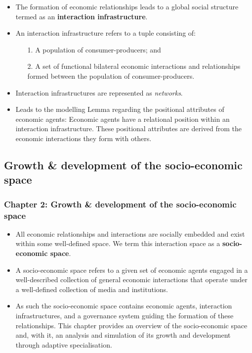 \documentclass[10pt]{beamer}
\begin{document}
\begin{frame} %
\begin{itemize}
\item The formation of economic relationships leads to a global social structure termed as an \textbf{interaction infrastructure}.
\medskip
\item An interaction infrastructure refers to a tuple consisting of:
\begin{itemize}
\medskip
\item[1.] A population of consumer-producers; and
\medskip
\item[2.] A set of functional bilateral economic interactions and relationships formed between the population of consumer-producers.
\end{itemize}
\medskip
\item Interaction infrastructures are represented as \emph{networks}.
\medskip
\item Leads to the modelling Lemma regarding the positional attributes of economic agents: Economic agents have a relational position within an interaction infrastructure. These positional attributes are derived from the economic interactions they form with others.
\end{itemize}
\end{frame}

\subsection{Growth \& development of the socio-economic space}

\begin{frame} \frametitle{Chapter 2: Growth \& development of the socio-economic space}
\begin{itemize}
\item All economic relationships and interactions are socially embedded and exist within some well-defined space. We term this interaction space as a \textbf{socio-economic space}.
\medskip
\item A socio-economic space refers to a given set of economic agents engaged in a well-described collection of general economic interactions that operate under a well-defined collection of media and institutions.
\medskip
\item As such the socio-economic space contains economic agents, interaction infrastructures, and a governance system guiding the formation of these relationships.
\medskip
\ietm This chapter provides an overview of the socio-economic space and, with it, an analysis and simulation of its growth and development through adaptive specialisation.
\end{itemize}
\end{frame}
\end{document}
